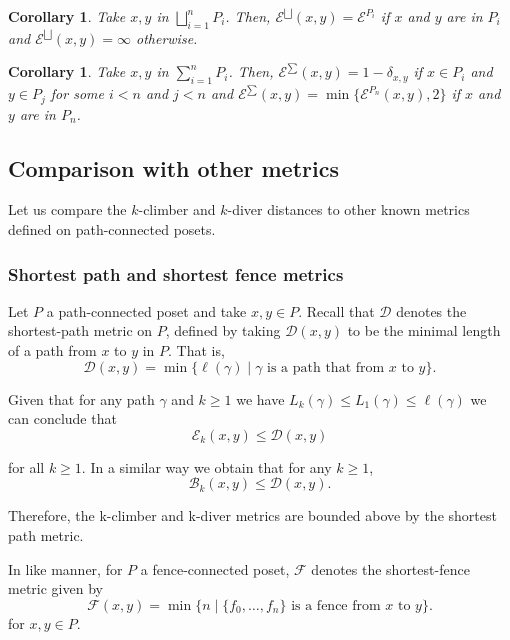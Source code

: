 \documentclass{article}[12pt]
\theoremstyle{exampstyle}
\newtheorem{corollary}[theorem]{Corollary}
\theoremstyle{remark}
\newcommand{\B}{\mathcal{B}}
\newcommand{\D}{\mathcal{D}}
\newcommand{\E}{\mathcal{E}}
\newcommand{\F}{\mathcal{F}}
\newcommand{\tuple}[3][1]{#2_{#1}, \dots , #2_{#3}}
\begin{document}
\begin{corollary}
    Take $x,y$ in $\bigsqcup_{i=1}^n P_i$. Then, $\E^{\bigsqcup}(x,y) = \E^{P_i} $ if $x$ and $y$ are in $P_i$ and $\E^{\bigsqcup}(x,y) = \infty$ otherwise.
\end{corollary}

\begin{corollary}
    Take $x,y$ in $\sum_{i=1}^n P_i$. Then, $\E^{\sum}(x,y) = 1 - \delta_{x,y}$ if $x \in P_i$ and $y \in P_j$ for some $i< n$ and $j < n$ and $\E^{\sum}(x,y) = \min \{\E^{P_n}(x,y), 2\}$ if $x$ and $y$ are in $P_n$.
\end{corollary}

\subsection{Comparison with other metrics}

Let us compare the $k$-climber and $k$-diver distances to other known metrics defined on path-connected posets.

\subsubsection*{Shortest path and shortest fence metrics}

Let $P$ a path-connected poset and take $x,y \in P$. Recall that $\D$ denotes the shortest-path metric on $P$, defined by taking $\D(x,y)$ to be the minimal length of a path from $x$ to $y$ in $P$. That is,   
\begin{equation*}
    \D(x,y) = \min \{ \ell(\gamma) \mid \gamma \text { is a path that from } x \text{ to } y \}.
\end{equation*}

Given that for any path $\gamma$ and $k \geq 1$ we have $L_k(\gamma) \leq L_1(\gamma) \leq \ell(\gamma) $ we can conclude that 
\begin{equation*}
    \E_k(x,y) \leq \D(x,y)
\end{equation*}

for all $k \geq 1$. In a similar way we obtain that for any $k \geq 1$,
\begin{equation*}
    \B_k(x,y) \leq \D(x,y).
\end{equation*}

Therefore, the k-climber and k-diver metrics are bounded above by the shortest path metric.

In like manner,  for $P$ a fence-connected poset, $\F$ denotes the shortest-fence metric given by  
\begin{equation*}
    \F(x,y) = \min \{ n \mid \{ \tuple[0]{f}{n} \} \text { is a fence from } x \text{ to } y \}.
\end{equation*}
for $x,y \in P$.
\end{document}
